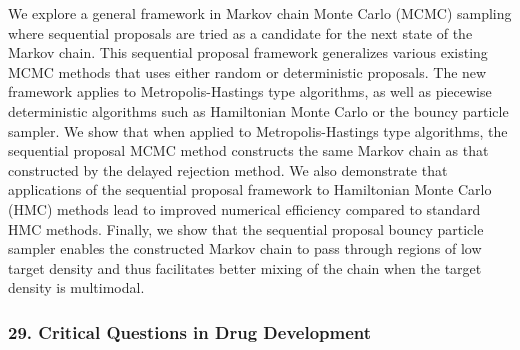 \begin{itemize}
We explore a general framework in Markov chain Monte Carlo (MCMC) sampling where sequential proposals are tried as a candidate for the next state of the Markov chain. This sequential proposal framework generalizes various existing MCMC methods that uses either random or deterministic proposals. The new framework applies to Metropolis-Hastings type algorithms, as well as piecewise deterministic algorithms such as Hamiltonian Monte Carlo or the bouncy particle sampler. We show that when applied to Metropolis-Hastings type algorithms, the sequential proposal MCMC method constructs the same Markov chain as that constructed by the delayed rejection method. We also demonstrate that applications of the sequential proposal framework to Hamiltonian Monte Carlo (HMC) methods lead to improved numerical efficiency compared to standard HMC methods. Finally, we show that the sequential proposal bouncy particle sampler enables the constructed Markov chain to pass through regions of low target density and thus facilitates better mixing of the chain when the target density is multimodal.

\end{itemize}

\subsubsection*{29. Critical Questions in Drug Development}

